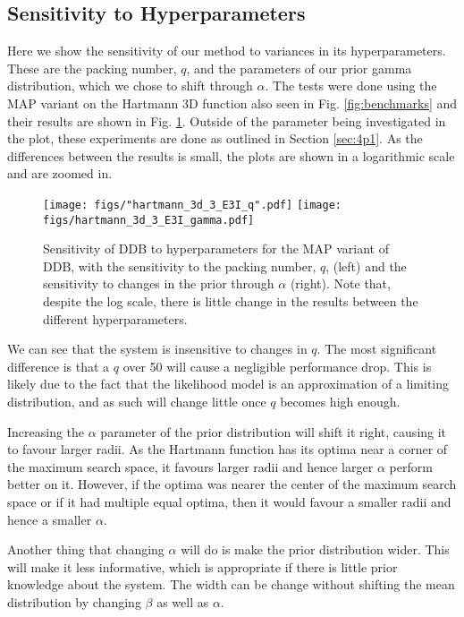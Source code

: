 \documentclass[preprint]{elsarticle}
\begin{document}
\subsection{Sensitivity to Hyperparameters}
Here we show the sensitivity of our method to variances in its hyperparameters. These are the packing number, $q$, and the parameters of our prior gamma distribution, which we chose to shift through $\alpha$. The tests were done using the MAP variant on the Hartmann 3D function also seen in Fig. \ref{fig:benchmarks} and their results are shown in Fig. \ref{fig:HP_test}. Outside of the parameter being investigated in the plot, these experiments are done as outlined in Section \ref{sec:4p1}. As the differences between the results is small, the plots are shown in a logarithmic scale and are zoomed in.  

\begin{figure}
\centering
\texttt{[image: figs/"hartmann\_3d\_3\_E3I\_q".pdf]}
\texttt{[image: figs/hartmann\_3d\_3\_E3I\_gamma.pdf]}
\caption{Sensitivity of DDB to hyperparameters for the MAP variant of DDB, with the sensitivity to the packing number, $q$, (left) and the sensitivity to changes in the prior through $\alpha$ (right). Note that, despite the log scale, there is little change in the results between the different hyperparameters. \label{fig:HP_test}}
\end{figure}

We can see that the system is insensitive to changes in $q$. The most significant difference is that a $q$ over 50 will cause a negligible performance drop. This is likely due to the fact that the likelihood model is an approximation of a limiting distribution, and as such will change little once $q$ becomes high enough.

Increasing the $\alpha$ parameter of the prior distribution will shift it right, causing it to favour larger radii. As the Hartmann function has its optima near a corner of the maximum search space, it favours larger radii and hence larger $\alpha$ perform better on it. However, if the optima was nearer the center of the maximum search space or if it had multiple equal optima, then it would favour a smaller radii and hence a smaller $\alpha$.

Another thing that changing $\alpha$ will do is make the prior distribution wider. This will make it less informative, which is appropriate if there is little prior knowledge about the system. The width can be change without shifting the mean distribution by changing $\beta$ as well as $\alpha$.
\end{document}
